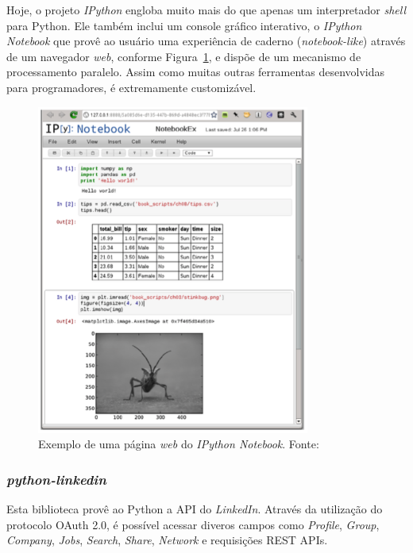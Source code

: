 Hoje, o projeto \textit{IPython} engloba muito mais do que apenas um interpretador \textit{shell} para Python. Ele também inclui um console gráfico interativo, o \textit{IPython Notebook} que provê ao usuário uma experiência de caderno (\textit{notebook-like}) através de um navegador \textit{web}, conforme Figura~\ref{ipython-fig}, e dispõe de um mecanismo de processamento paralelo. Assim como muitas outras ferramentas desenvolvidas para programadores, é extremamente customizável. \cite{mining-social-web}

\begin{figure}[h!]
  \centering
  \includegraphics[width=0.8\textwidth]{Cap4/imagens/ipython-notebook}
  \caption{Exemplo de uma página \textit{web} do \textit{IPython Notebook}. Fonte: }
  \label{ipython-fig}
\end{figure}


\subsubsection{\textit{python-linkedin}}
Esta biblioteca provê ao Python a API do \textit{LinkedIn}. Através da utilização do protocolo OAuth 2.0, é possível acessar diveros campos como \textit{Profile}, \textit{Group}, \textit{Company}, \textit{Jobs}, \textit{Search}, \textit{Share}, \textit{Network} e requisições REST APIs. \cite{python-linkedin}

